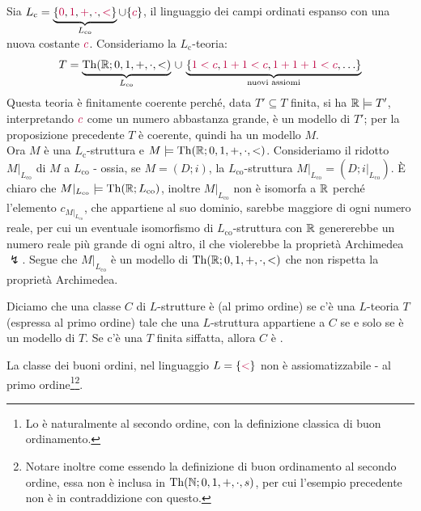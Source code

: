 \begin{soln}
    Sia $L_{\text{c}} = \underbrace{\{\textcolor{purple}{0}, \textcolor{purple}{1}, \textcolor{purple}{+}, \textcolor{purple}{\cdot}, \textcolor{purple}{<}\}}_{L_\text{co}} \cup \{\textcolor{purple}{c}\}$, il linguaggio dei campi ordinati espanso con una nuova costante $\textcolor{purple}{c}$. Consideriamo la $L_{\text{c}}$-teoria:
    \[ T = \underbrace{\operatorname{Th}(\mathbb R;0,1,+,\cdot,<)}_{L_\text{co}} \,\cup\, \underbrace{\{\textcolor{purple}{1 < c}, \textcolor{purple}{1 + 1 < c}, \textcolor{purple}{1 + 1 + 1 < c}, \ldots\}}_{\text{nuovi assiomi}}
    \]
    Questa teoria è finitamente coerente perché, data $T' \subseteq T$ finita, si ha $\mathbb R \models T'$, interpretando $\textcolor{purple}{c}$ come un numero abbastanza grande, è un modello di $T'$; per la proposizione precedente $T$ è coerente, quindi ha un modello $M$.\\
    Ora $M$ è una $L_{\text{c}}$-struttura e $M \models \operatorname{Th}(\mathbb R;0,1,+,\cdot,<)$. Consideriamo il ridotto $M|_{L_{\text{co}}}$ di $M$ a $L_{\text{co}}$ - ossia, se $M = (D;i)$, la $L_{\text{co}}$-struttura $M|_{L_{\text{co}}} = (D;i|_{L_{\text{co}}})$. È chiaro che $M|_{L_{\text{co}}} \models \operatorname{Th}(\mathbb R;L_{\text{co}})$,
    inoltre $M|_{L_{\text{co}}}$ non è isomorfa a $\mathbb R$ perché l'elemento $c_{M|_{L_{\text{co}}}}$, che appartiene al suo dominio, sarebbe maggiore di ogni numero reale, per cui un eventuale isomorfismo di $L_{\text{co}}$-struttura con $\mathbb R$ genererebbe un numero reale più grande di ogni altro, il che violerebbe la proprietà Archimedea $\lightning$.
    Segue che $M|_{L_{\text{co}}}$ è un modello di $\operatorname{Th}(\mathbb R;0,1,+,\cdot,<)$ che non rispetta la proprietà Archimedea.
\end{soln}

\begin{definition}
    Diciamo che una classe $C$ di $L$-strutture è  (al primo ordine) se c'è una $L$-teoria $T$ (espressa al primo ordine) tale che
    una $L$-struttura appartiene a $C$ se e solo se è un modello di $T$. Se c'è una $T$ finita siffatta, allora $C$ è .
\end{definition}

\begin{example}
    La classe dei buoni ordini, nel linguaggio $L = \{\textcolor{purple}{<}\}$ non è assiomatizzabile - al primo ordine\footnote{Lo è naturalmente al secondo ordine, con la definizione classica di buon ordinamento.}\footnote{Notare inoltre come essendo la definizione di buon ordinamento al secondo ordine, essa non è inclusa in $\operatorname{Th}(\mathbb N;0,1,+,\cdot,s)$,
    per cui l'esempio precedente non è in contraddizione con questo.}.
\end{example}

